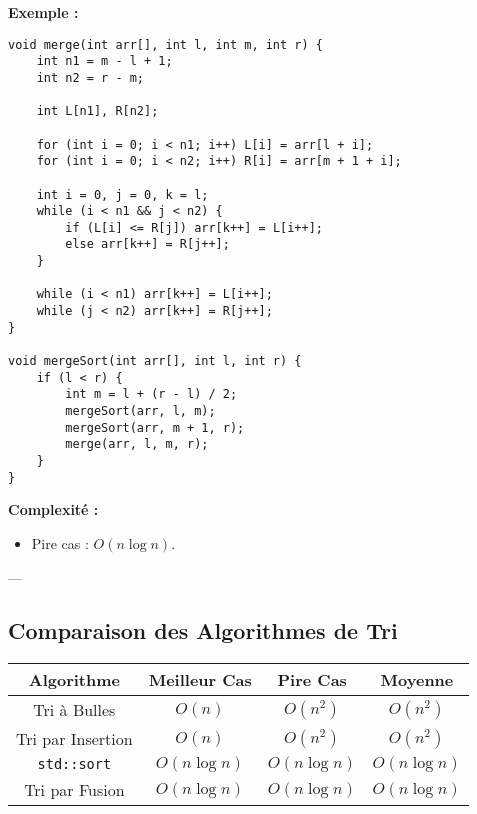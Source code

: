 \textbf{Exemple :}
\begin{tcolorbox}[colframe=blue!50!black, colback=blue!5!white, title=Exemple d'Attributs et Méthodes Statistiques]
\begin{verbatim}
void merge(int arr[], int l, int m, int r) {
    int n1 = m - l + 1;
    int n2 = r - m;

    int L[n1], R[n2];

    for (int i = 0; i < n1; i++) L[i] = arr[l + i];
    for (int i = 0; i < n2; i++) R[i] = arr[m + 1 + i];

    int i = 0, j = 0, k = l;
    while (i < n1 && j < n2) {
        if (L[i] <= R[j]) arr[k++] = L[i++];
        else arr[k++] = R[j++];
    }

    while (i < n1) arr[k++] = L[i++];
    while (j < n2) arr[k++] = R[j++];
}

void mergeSort(int arr[], int l, int r) {
    if (l < r) {
        int m = l + (r - l) / 2;
        mergeSort(arr, l, m);
        mergeSort(arr, m + 1, r);
        merge(arr, l, m, r);
    }
}
\end{verbatim}
\end{tcolorbox}

\textbf{Complexité :}
\begin{itemize}
    \item Pire cas : $O(n \log n)$.
\end{itemize}

---

\subsection{ Comparaison des Algorithmes de Tri}
\begin{center}
\begin{tabular}{|c|c|c|c|}
\hline
\textbf{Algorithme} & \textbf{Meilleur Cas} & \textbf{Pire Cas} & \textbf{Moyenne} \\
\hline
Tri à Bulles & $O(n)$ & $O(n^2)$ & $O(n^2)$ \\
\hline
Tri par Insertion & $O(n)$ & $O(n^2)$ & $O(n^2)$ \\
\hline
\texttt{std::sort} & $O(n \log n)$ & $O(n \log n)$ & $O(n \log n)$ \\
\hline
Tri par Fusion & $O(n \log n)$ & $O(n \log n)$ & $O(n \log n)$ \\
\hline
\end{tabular}
\end{center}
